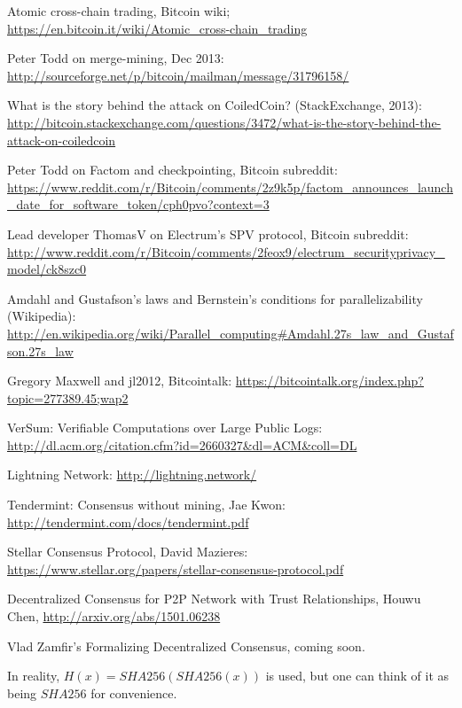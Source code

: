 \documentclass[11pt,a4paper]{article}
\theoremstyle{plain}
\theoremstyle{definition}
\theoremstyle{remark}
\begin{document}
\begin{thebibliography}{40}

    Atomic cross-chain trading, Bitcoin wiki; \url{https://en.bitcoin.it/wiki/Atomic_cross-chain_trading}

    Peter Todd on merge-mining, Dec 2013: \url{http://sourceforge.net/p/bitcoin/mailman/message/31796158/}

    What is the story behind the attack on CoiledCoin? (StackExchange, 2013): \url{http://bitcoin.stackexchange.com/questions/3472/what-is-the-story-behind-the-attack-on-coiledcoin}

    Peter Todd on Factom and checkpointing, Bitcoin subreddit: \url{https://www.reddit.com/r/Bitcoin/comments/2z9k5p/factom_announces_launch_date_for_software_token/cph0pvo?context=3}

    Lead developer ThomasV on Electrum's SPV protocol, Bitcoin subreddit: \url{http://www.reddit.com/r/Bitcoin/comments/2feox9/electrum_securityprivacy_model/ck8szc0}

    Amdahl and Gustafson's laws and Bernstein's conditions for parallelizability (Wikipedia): \url{http://en.wikipedia.org/wiki/Parallel_computing#Amdahl.27s_law_and_Gustafson.27s_law}

    Gregory Maxwell and jl2012, Bitcointalk: \url{https://bitcointalk.org/index.php?topic=277389.45;wap2}

    VerSum: Verifiable Computations over Large Public Logs: \url{http://dl.acm.org/citation.cfm?id=2660327&dl=ACM&coll=DL}

    Lightning Network: \url{http://lightning.network/}

    Tendermint: Consensus without mining, Jae Kwon: \url{http://tendermint.com/docs/tendermint.pdf}

    Stellar Consensus Protocol, David Mazieres: \url{https://www.stellar.org/papers/stellar-consensus-protocol.pdf}

    Decentralized Consensus for P2P Network with Trust Relationships, Houwu Chen, \url{http://arxiv.org/abs/1501.06238}

    Vlad Zamfir's Formalizing Decentralized Consensus, coming soon.

    In reality, $H(x) = SHA256(SHA256(x))$ is used, but one can think of it as being $SHA256$ for convenience.


\end{thebibliography}
\end{document}
